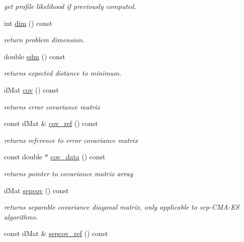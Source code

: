\begin{DoxyCompactItemize}
\begin{DoxyCompactList}\small\item\em get profile likelihood if previously computed. \end{DoxyCompactList}\item 
int \hyperlink{classlibcmaes_1_1CMASolutions_ac8d07f19d5e4cdbab456ef9d00acb16e}{dim} () const 
\begin{DoxyCompactList}\small\item\em return problem dimension. \end{DoxyCompactList}\item 
double \hyperlink{classlibcmaes_1_1CMASolutions_a33a5f2f6bc03c9b459d58f079a1a2d38}{edm} () const 
\begin{DoxyCompactList}\small\item\em returns expected distance to minimum. \end{DoxyCompactList}\item 
d\-Mat \hyperlink{classlibcmaes_1_1CMASolutions_a8b3cd4f1b85c820190eedbf81f49a441}{cov} () const 
\begin{DoxyCompactList}\small\item\em returns error covariance matrix \end{DoxyCompactList}\item 
const d\-Mat \& \hyperlink{classlibcmaes_1_1CMASolutions_a853dc543b4d2845df451ec112d00d311}{cov\-\_\-ref} () const 
\begin{DoxyCompactList}\small\item\em returns reference to error covariance matrix \end{DoxyCompactList}\item 
const double $\ast$ \hyperlink{classlibcmaes_1_1CMASolutions_a1db02206c1f0b90b935a47c923c5373d}{cov\-\_\-data} () const 
\begin{DoxyCompactList}\small\item\em returns pointer to covariance matrix array \end{DoxyCompactList}\item 
d\-Mat \hyperlink{classlibcmaes_1_1CMASolutions_ab79973d3d76c8ffb810608252ba72df9}{sepcov} () const 
\begin{DoxyCompactList}\small\item\em returns separable covariance diagonal matrix, only applicable to sep-\/\-C\-M\-A-\/\-E\-S algorithms. \end{DoxyCompactList}\item 
const d\-Mat \& \hyperlink{classlibcmaes_1_1CMASolutions_a21617b6ff54abd57a1b18667d8eb1724}{sepcov\-\_\-ref} () const 

\end{DoxyCompactItemize}
